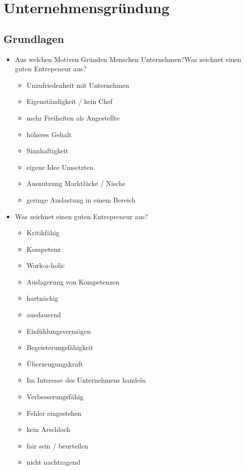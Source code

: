 \newpage\section{Unternehmensgründung}
    \subsection{Grundlagen}

\begin{itemize}
    \item Aus welchen Motiven Gründen Menschen Unternehmen?Was zeichnet einen guten Entrepeneur aus?
    \begin{itemize}
        \item Unzufriedenheit mit Unternehmen
        \item Eigenständigkeit / kein Chef
        \item mehr Freiheiten als Angestellte
        \item höheres Gehalt
        \item Sinnhaftigkeit
        \item eigene Idee Umsetzten
        \item Ausnutzung Marktlücke / Nische
        \item  geringe Auslastung in einem Bereich
    \end{itemize}
    \item Was zeichnet einen guten Entrepreneur aus?
    \begin{itemize}
        \item Kritikfähig
        \item Kompetenz
        \item Work-a-holic
        \item Auslagerung von Kompetenzen
        \item hartnäckig
        \item ausdauernd
        \item Einfühlungsvermögen
        \item Begeisterungsfähigkeit
        \item Überzeugungskraft
        \item Im Interesse des Unternehmens handeln
        \item Verbesserungsfähig
        \item Fehler eingestehen
        \item kein Arschloch
        \item fair sein / beurteilen
        \item nicht nachtragend

\end{itemize}
\end{itemize}
